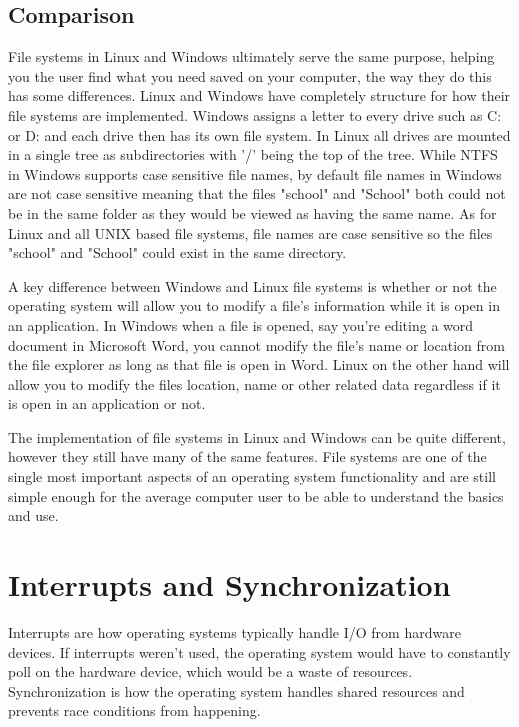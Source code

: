 \documentclass[10pt,serif,draftclsnofoot,onecolumn]{IEEEtran}
\begin{document}
	\subsection{Comparison}
	\par
	File systems in Linux and Windows ultimately serve the same purpose, helping you the user find what you need saved on your computer, the way they do this has some differences. Linux and Windows have completely structure for how their file systems are implemented. Windows assigns a letter to every drive such as C: or D: and each drive then has its own file system\cite{19}. In Linux all drives are mounted in a single tree as subdirectories with '/' being the top of the tree. While NTFS in Windows supports case sensitive file names, by default  file names in Windows are not case sensitive meaning that the files "school" and "School" both could not be in the same folder as they would be viewed as having the same name. As for Linux and all UNIX based file systems, file names are case sensitive so the files "school" and "School" could exist in the same directory.
	\newline
	\par
	A key difference between Windows and Linux file systems is whether or not the operating system will allow you to modify a file's information while it is open in an application. In Windows when a file is opened, say you're editing a word document in Microsoft Word, you cannot modify the file's name or location from the file explorer as long as that file is open in Word. Linux on the other hand will allow you to modify the files location, name or other related data regardless if it is open in an application or not.
	\newline
	\par
	The implementation of file systems in Linux and Windows can be quite different, however they still have many of the same features. File systems are one of the single most important aspects of an operating system functionality and are still simple enough for the average computer user to be able to understand the basics and use.
\section{Interrupts and Synchronization}
	\par
	Interrupts are how operating systems typically handle I/O from hardware devices. If interrupts weren't used, the operating system would have to constantly poll on the hardware device, which would be a waste of resources. Synchronization is how the operating system handles shared resources and prevents race conditions from happening.
\end{document}
